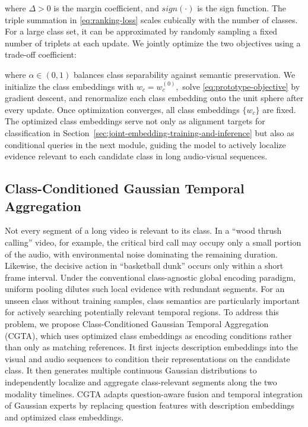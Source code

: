 
\noindent\unskip where $\Delta >0$ is the margin coefficient, and $sign(\cdot )$ is the sign function. The triple summation in \eqref{eq:ranking-loss} scales cubically with the number of classes. For a large class set, it can be approximated by randomly sampling a fixed number of triplets at each update. We jointly optimize the two objectives using a trade-off coefficient:


\noindent\unskip where $\alpha \in (0,1)$ balances class separability against semantic preservation. We initialize the class embeddings with ${w}_{c}={w}_{c}^{(0)},$ solve \eqref{eq:prototype-objective} by gradient descent, and renormalize each class embedding onto the unit sphere after every update. Once optimization converges, all class embeddings $\{{w}_{c}\}$ are fixed. The optimized class embeddings serve not only as alignment targets for classification in Section~\ref{sec:joint-embedding-training-and-inference} but also as conditional queries in the next module, guiding the model to actively localize evidence relevant to each candidate class in long audio-visual sequences.

\subsection{Class-Conditioned Gaussian Temporal Aggregation}\label{sec:class-conditioned-gaussian-temporal-aggregation}

Not every segment of a long video is relevant to its class. In a \textquotedblleft{}wood thrush calling\textquotedblright{} video, for example, the critical bird call may occupy only a small portion of the audio, with environmental noise dominating the remaining duration. Likewise, the decisive action in \textquotedblleft{}basketball dunk\textquotedblright{} occurs only within a short frame interval. Under the conventional class-agnostic global encoding paradigm, uniform pooling dilutes such local evidence with redundant segments. For an unseen class without training samples, class semantics are particularly important for actively searching potentially relevant temporal regions. To address this problem, we propose Class-Conditioned Gaussian Temporal Aggregation (CGTA), which uses optimized class embeddings as encoding conditions rather than only as matching references. It first injects description embeddings into the visual and audio sequences to condition their representations on the candidate class. It then generates multiple continuous Gaussian distributions to independently localize and aggregate class-relevant segments along the two modality timelines. CGTA adapts question-aware fusion and temporal integration of Gaussian experts \cite{kim2025qatiger} by replacing question features with description embeddings and optimized class embeddings.

